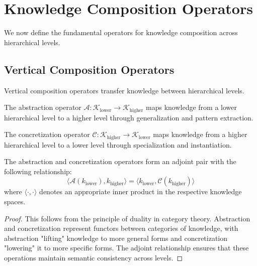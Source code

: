 \section{Knowledge Composition Operators}



We now define the fundamental operators for knowledge composition across hierarchical levels.

\subsection{Vertical Composition Operators}

Vertical composition operators transfer knowledge between hierarchical levels.

\begin{definition}
The abstraction operator $\mathcal{A}: \mathcal{K}_{\text{lower}} \rightarrow \mathcal{K}_{\text{higher}}$ maps knowledge from a lower hierarchical level to a higher level through generalization and pattern extraction.
\end{definition}

\begin{definition}
The concretization operator $\mathcal{C}: \mathcal{K}_{\text{higher}} \rightarrow \mathcal{K}_{\text{lower}}$ maps knowledge from a higher hierarchical level to a lower level through specialization and instantiation.
\end{definition}

\begin{theorem}
The abstraction and concretization operators form an adjoint pair with the following relationship:
\begin{equation}
\langle \mathcal{A}(k_{\text{lower}}), k_{\text{higher}} \rangle = \langle k_{\text{lower}}, \mathcal{C}(k_{\text{higher}}) \rangle
\end{equation}
where $\langle \cdot, \cdot \rangle$ denotes an appropriate inner product in the respective knowledge spaces.
\end{theorem}

\begin{proof}
This follows from the principle of duality in category theory. Abstraction and concretization represent functors between categories of knowledge, with abstraction "lifting" knowledge to more general forms and concretization "lowering" it to more specific forms. The adjoint relationship ensures that these operations maintain semantic consistency across levels.
\end{proof}

